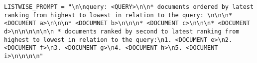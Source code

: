 \begin{verbatim}
LISTWISE_PROMPT = "\n\nquery: <QUERY>\n\n* documents ordered by latest ranking from highest to lowest in relation to the query: \n\n\n* <DOCUMENT a>\n\n\n* <DOCUMNET b>\n\n\n* <DOCUMENT c>\n\n\n* <DOCUMENT d>\n\n\n\n\n\n * documents ranked by second to latest ranking from highest to lowest in relation to the query:\n1. <DOCUMENT e>\n2. <DOCUMENT f>\n3. <DOCUMENT g>\n4. <DOCUMENT h>\n5. <DOCUMENT i>\n\n\n\n"
\end{verbatim}